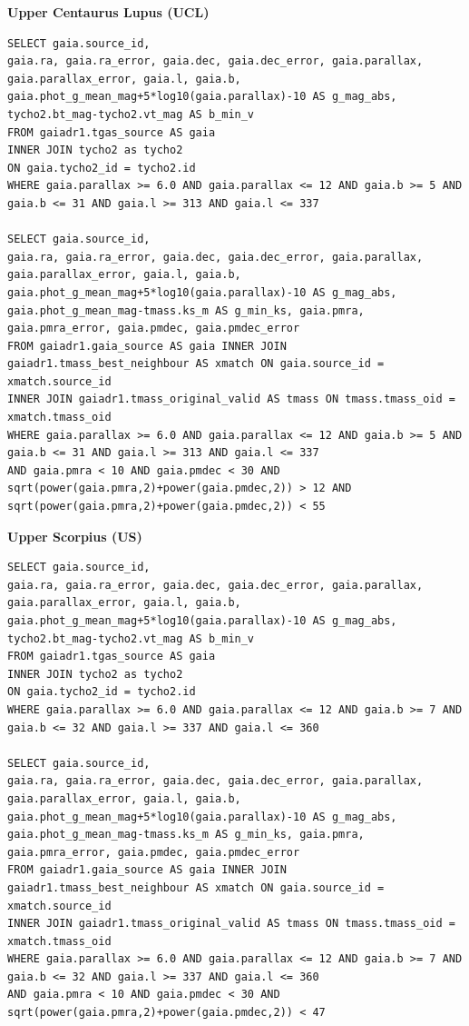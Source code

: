\textbf{Upper Centaurus Lupus (UCL)}
\begin{lstlisting}[frame = single]
SELECT gaia.source_id, 
gaia.ra, gaia.ra_error, gaia.dec, gaia.dec_error, gaia.parallax, gaia.parallax_error, gaia.l, gaia.b,
gaia.phot_g_mean_mag+5*log10(gaia.parallax)-10 AS g_mag_abs,
tycho2.bt_mag-tycho2.vt_mag AS b_min_v
FROM gaiadr1.tgas_source AS gaia
INNER JOIN tycho2 as tycho2
ON gaia.tycho2_id = tycho2.id
WHERE gaia.parallax >= 6.0 AND gaia.parallax <= 12 AND gaia.b >= 5 AND gaia.b <= 31 AND gaia.l >= 313 AND gaia.l <= 337

SELECT gaia.source_id, 
gaia.ra, gaia.ra_error, gaia.dec, gaia.dec_error, gaia.parallax, gaia.parallax_error, gaia.l, gaia.b, 
gaia.phot_g_mean_mag+5*log10(gaia.parallax)-10 AS g_mag_abs, 
gaia.phot_g_mean_mag-tmass.ks_m AS g_min_ks, gaia.pmra, gaia.pmra_error, gaia.pmdec, gaia.pmdec_error 
FROM gaiadr1.gaia_source AS gaia INNER JOIN gaiadr1.tmass_best_neighbour AS xmatch ON gaia.source_id = xmatch.source_id 
INNER JOIN gaiadr1.tmass_original_valid AS tmass ON tmass.tmass_oid = xmatch.tmass_oid 
WHERE gaia.parallax >= 6.0 AND gaia.parallax <= 12 AND gaia.b >= 5 AND gaia.b <= 31 AND gaia.l >= 313 AND gaia.l <= 337 
AND gaia.pmra < 10 AND gaia.pmdec < 30 AND sqrt(power(gaia.pmra,2)+power(gaia.pmdec,2)) > 12 AND sqrt(power(gaia.pmra,2)+power(gaia.pmdec,2)) < 55
\end{lstlisting}\vspace{5mm}

\textbf{Upper Scorpius (US)}
\begin{lstlisting}[frame = single]
SELECT gaia.source_id, 
gaia.ra, gaia.ra_error, gaia.dec, gaia.dec_error, gaia.parallax, gaia.parallax_error, gaia.l, gaia.b,
gaia.phot_g_mean_mag+5*log10(gaia.parallax)-10 AS g_mag_abs,
tycho2.bt_mag-tycho2.vt_mag AS b_min_v
FROM gaiadr1.tgas_source AS gaia
INNER JOIN tycho2 as tycho2
ON gaia.tycho2_id = tycho2.id
WHERE gaia.parallax >= 6.0 AND gaia.parallax <= 12 AND gaia.b >= 7 AND gaia.b <= 32 AND gaia.l >= 337 AND gaia.l <= 360

SELECT gaia.source_id, 
gaia.ra, gaia.ra_error, gaia.dec, gaia.dec_error, gaia.parallax, gaia.parallax_error, gaia.l, gaia.b,
gaia.phot_g_mean_mag+5*log10(gaia.parallax)-10 AS g_mag_abs, 
gaia.phot_g_mean_mag-tmass.ks_m AS g_min_ks, gaia.pmra, gaia.pmra_error, gaia.pmdec, gaia.pmdec_error 
FROM gaiadr1.gaia_source AS gaia INNER JOIN gaiadr1.tmass_best_neighbour AS xmatch ON gaia.source_id = xmatch.source_id 
INNER JOIN gaiadr1.tmass_original_valid AS tmass ON tmass.tmass_oid = xmatch.tmass_oid 
WHERE gaia.parallax >= 6.0 AND gaia.parallax <= 12 AND gaia.b >= 7 AND gaia.b <= 32 AND gaia.l >= 337 AND gaia.l <= 360 
AND gaia.pmra < 10 AND gaia.pmdec < 30 AND sqrt(power(gaia.pmra,2)+power(gaia.pmdec,2)) < 47
\end{lstlisting}

